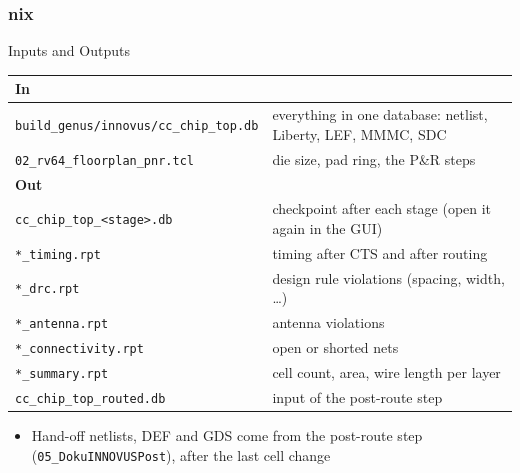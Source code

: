 \documentclass{beamer}
\newcommand{\astitle}{nix}
\newcommand{\assubtitle}{nix}
\newcommand{\cmd}[1]{\texttt{#1}}
\begin{document}
\renewcommand{\assubtitle}{Inputs and Outputs}
\begin{frame}
\frametitle{\astitle}
\begin{block}{\assubtitle}
  \scriptsize
  \begin{tabularx}{\linewidth}{@{}lY@{}}
    \textbf{In}                    & \\\hline
    \cmd{build\_genus/innovus/cc\_chip\_top.db} & everything in one database:
                                     netlist, Liberty, LEF, MMMC, SDC\\[1pt]
    \cmd{02\_rv64\_floorplan\_pnr.tcl} & die size, pad ring, the P\&R steps\\[4pt]
    \textbf{Out}                   & \\\hline
    \cmd{cc\_chip\_top\_<stage>.db} & checkpoint after each stage
                                     (open it again in the GUI)\\[1pt]
    \cmd{*\_timing.rpt}            & timing after CTS and after routing\\[1pt]
    \cmd{*\_drc.rpt}               & design rule violations (spacing, width, \dots)\\[1pt]
    \cmd{*\_antenna.rpt}           & antenna violations\\[1pt]
    \cmd{*\_connectivity.rpt}      & open or shorted nets\\[1pt]
    \cmd{*\_summary.rpt}           & cell count, area, wire length per layer\\[1pt]
    \cmd{cc\_chip\_top\_routed.db} & input of the post-route step\\
  \end{tabularx}
  \vspace{4pt}
  \begin{itemize}
    \item Hand-off netlists, DEF and GDS come from the post-route step
      (\cmd{05\_DokuINNOVUSPost}), after the last cell change
  \end{itemize}
\end{block}
\end{frame}
\end{document}
